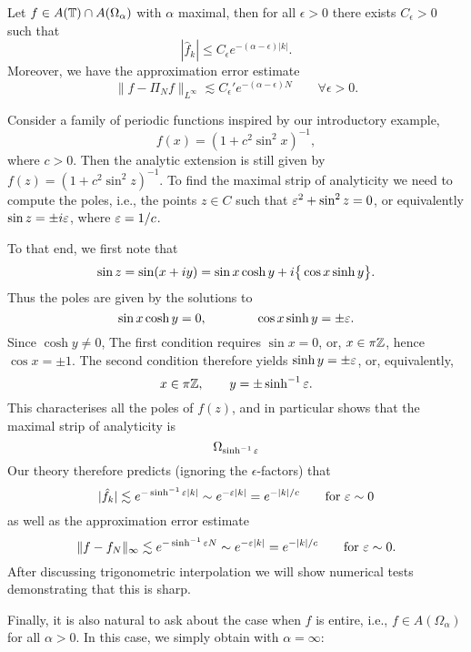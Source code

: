 \begin{corollary} \label{th:trig:pw-sharp}
  Let $f \in A(\mathbb{T}) \cap A(\Omega_\alpha)$ with $\alpha$ maximal, then
  for all $\epsilon > 0$ there exists $C_\epsilon > 0$ such that
  \[
    |\hat{f}_k| \leq C_\epsilon e^{- (\alpha-\epsilon) |k|}.
  \]
  Moreover, we have the approximation error estimate
  \[
    \| f - \Pi_N f \|_{L^\infty} \lesssim C_\epsilon' e^{-(\alpha-\epsilon) N}
    \qquad \forall \epsilon > 0.
  \]
\end{corollary}

\begin{example}
  Consider a family of periodic functions inspired by our introductory example,
  \[
    f(x) = (1 + c^2 \sin^2 x)^{-1},
  \]
  where $c > 0$. Then the analytic extension is still given by $f(z) = (1 + c^2
  \sin^2 z)^{-1}$. To find the maximal strip of analyticity we need to compute
  the poles, i.e., the points $z \in C$ such that $\varepsilon^2 + \sin^2 z = 0$, or
  equivalently $\sin z = \pm i \varepsilon$, where $\varepsilon = 1/c$.

  To that end, we first note that
  \[
    \sin z = \sin (x + i y) = \sin x \cosh y + i \big\{ \cos x \sinh y \big\}.
  \]
  Thus the poles are given by the solutions to
  \[
       \sin x \cosh y = 0, \qquad \qquad
       \cos x \sinh y = \pm \varepsilon.
  \]
  Since $\cosh y \neq 0$, The first condition requires $\sin x = 0$, or,
  $x \in \pi \mathbb{Z}$, hence $\cos x = \pm 1$. The second condition therefore
  yields $\sinh y = \pm \varepsilon$, or, equivalently,
  \[
      x \in \pi \mathbb{Z}, \qquad y = \pm \sinh^{-1} \varepsilon.
  \]
  This characterises all the poles of $f(z)$, and in particular shows that
  the maximal strip of analyticity is
  \[
      \Omega_{\sinh^{-1} \varepsilon}
  \]
  Our theory therefore predicts (ignoring the $\epsilon$-factors) that
  \[
      |\hat{f}_k| \lesssim e^{- \sinh^{-1} \varepsilon |k|}
            \sim e^{- \varepsilon |k|} = e^{-|k|/c} \qquad \text{for $\varepsilon \sim 0$}
  \]
  as well as the approximation error estimate
  \[
      \| f - f_N \|_\infty \lesssim e^{- \sinh^{-1} \varepsilon N} \sim e^{- \varepsilon |k|}
      = e^{-|k|/c}
      \qquad \text{for $\varepsilon \sim 0$.}
  \]
  After discussing trigonometric interpolation we will show numerical
  tests demonstrating that this is sharp.
\end{example}


Finally, it is also natural to ask about the case when $f$ is entire, i.e.,
$f \in A(\Omega_\alpha)$ for all $\alpha > 0$. In this case, we simply
obtain  with $\alpha = \infty$:

